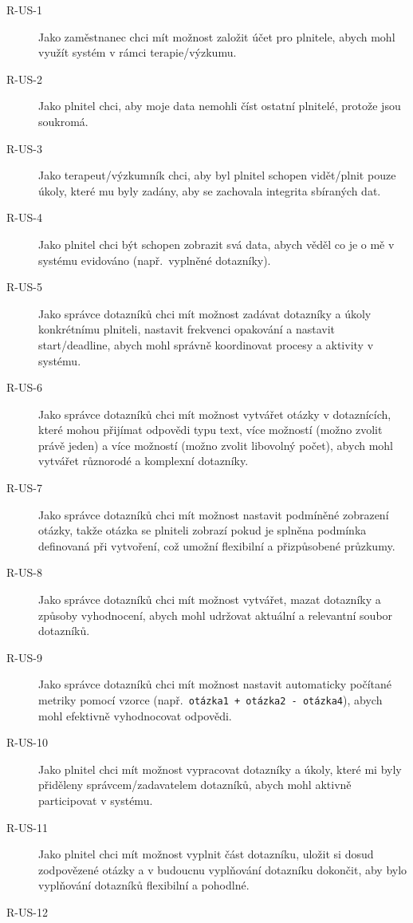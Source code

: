 \begin{description}
    \item[R-US-1]
    Jako zaměstnanec chci mít možnost založit účet pro plnitele, abych mohl využít systém v rámci terapie/výzkumu.
    \item[R-US-2]
    Jako plnitel chci, aby moje data nemohli číst ostatní plnitelé, protože jsou soukromá.
    \item[R-US-3]
    Jako terapeut/výzkumník chci, aby byl plnitel schopen vidět/plnit pouze úkoly, které mu byly zadány, aby se zachovala integrita sbíraných dat.
    \item[R-US-4]
    Jako plnitel chci být schopen zobrazit svá data, abych věděl co je o mě v systému evidováno (např.\ vyplněné dotazníky).
    \item[R-US-5]
    Jako správce dotazníků chci mít možnost zadávat dotazníky a úkoly konkrétnímu plniteli, nastavit frekvenci opakování a nastavit start/deadline, abych mohl správně koordinovat procesy a aktivity v systému.
    \item[R-US-6]
    Jako správce dotazníků chci mít možnost vytvářet otázky v dotaznících, které mohou přijímat odpovědi typu text, více možností (možno zvolit právě jeden) a více možností (možno zvolit libovolný počet), abych mohl vytvářet různorodé a komplexní dotazníky.
    \item[R-US-7]
    Jako správce dotazníků chci mít možnost nastavit podmíněné zobrazení otázky, takže otázka se plniteli zobrazí pokud je splněna podmínka definovaná při vytvoření, což umožní flexibilní a přizpůsobené průzkumy.
    \item[R-US-8]
    Jako správce dotazníků chci mít možnost vytvářet, mazat dotazníky a způsoby vyhodnocení, abych mohl udržovat aktuální a relevantní soubor dotazníků.
    \item[R-US-9]
    Jako správce dotazníků chci mít možnost nastavit automaticky počítané metriky pomocí vzorce (např.\ \texttt{otázka1 + otázka2 - otázka4}), abych mohl efektivně vyhodnocovat odpovědi.
    \item[R-US-10]
    Jako plnitel chci mít možnost vypracovat dotazníky a úkoly, které mi byly přiděleny správcem/zadavatelem dotazníků, abych mohl aktivně participovat v systému.
    \item[R-US-11]
    Jako plnitel chci mít možnost vyplnit část dotazníku, uložit si dosud zodpovězené otázky a v budoucnu vyplňování dotazníku dokončit, aby bylo vyplňování dotazníků flexibilní a pohodlné.
    \item[R-US-12]

\end{description}
